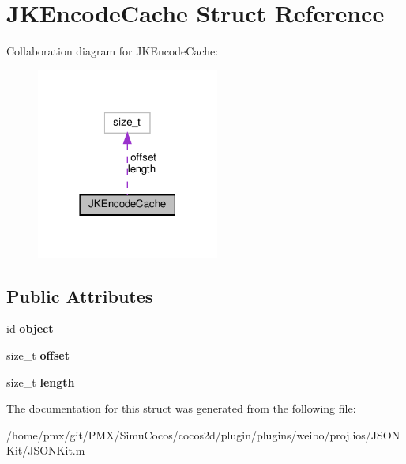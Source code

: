 \hypertarget{structJKEncodeCache}{}\section{J\+K\+Encode\+Cache Struct Reference}
\label{structJKEncodeCache}


Collaboration diagram for J\+K\+Encode\+Cache\+:
\nopagebreak
\begin{figure}[H]
\begin{center}
\leavevmode
\includegraphics[width=170pt]{structJKEncodeCache__coll__graph}
\end{center}
\end{figure}
\subsection*{Public Attributes}
\begin{DoxyCompactItemize}
\item 
\mbox{\label{structJKEncodeCache_a92d31ee910f818f9d319db5f6e1a17f0}} 
id {\bfseries object}
\item 
\mbox{\label{structJKEncodeCache_a7651dd8a8d77c384a286f0a6432a6a30}} 
size\+\_\+t {\bfseries offset}
\item 
\mbox{\label{structJKEncodeCache_a8d75c9aafedd78bd41f58a7cae621a5a}} 
size\+\_\+t {\bfseries length}
\end{DoxyCompactItemize}


The documentation for this struct was generated from the following file\+:\begin{DoxyCompactItemize}
\item 
/home/pmx/git/\+P\+M\+X/\+Simu\+Cocos/cocos2d/plugin/plugins/weibo/proj.\+ios/\+J\+S\+O\+N\+Kit/J\+S\+O\+N\+Kit.\+m\end{DoxyCompactItemize}
